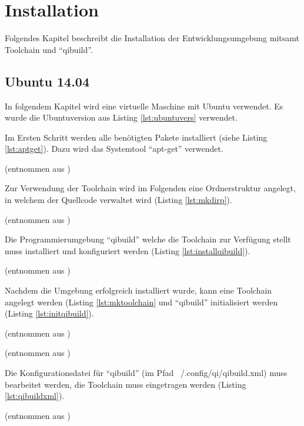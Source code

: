 \chapter{Installation}

    Folgendes Kapitel beschreibt die Installation der Entwicklungsumgebung mitsamt
    Toolchain und ``qibuild''.

    \section{Ubuntu 14.04}

        In folgendem Kapitel wird eine virtuelle Maschine mit Ubuntu
        verwendet.
        Es wurde die Ubuntuversion aus Listing \ref{lst:ubuntuvers} verwendet.



        Im Ersten Schritt werden alle benötigten Pakete installiert (siehe
        Listing \ref{lst:aptget}).
        Dazu wird das Systemtool ``apt-get'' verwendet.


(entnommen aus \cite[S. 5, f.]{projss15})

        Zur Verwendung der Toolchain wird im Folgenden eine Ordnerstruktur
        angelegt, in welchem der Quellcode verwaltet wird (Listing
        \ref{lst:mkdirp}).


(entnommen aus \cite[S. 4]{projss15})

        Die Programmierumgebung ``qibuild'' welche die Toolchain zur Verfügung
        stellt muss installiert und konfiguriert werden (Listing
        \ref{lst:installqibuild}).


(entnommen aus \cite[S. 5]{projss15})

        Nachdem die Umgebung erfolgreich installiert wurde, kann eine Toolchain
        angelegt werden (Listing \ref{lst:mktoolchain} und ``qibuild''
        initialisiert werden (Listing \ref{lst:initqibuild}).


(entnommen aus \cite[S. 7]{projss15})


(entnommen aus \cite[S. 8, f.]{projss15})

        Die Konfigurationsdatei für ``qibuild''
        (im Pfad ~/.config/qi/qibuild.xml) muss bearbeitet werden, die
        Toolchain muss eingetragen werden (Listing \ref{lst:qibuildxml}).


(entnommen aus \cite[S. 8]{projss15})

